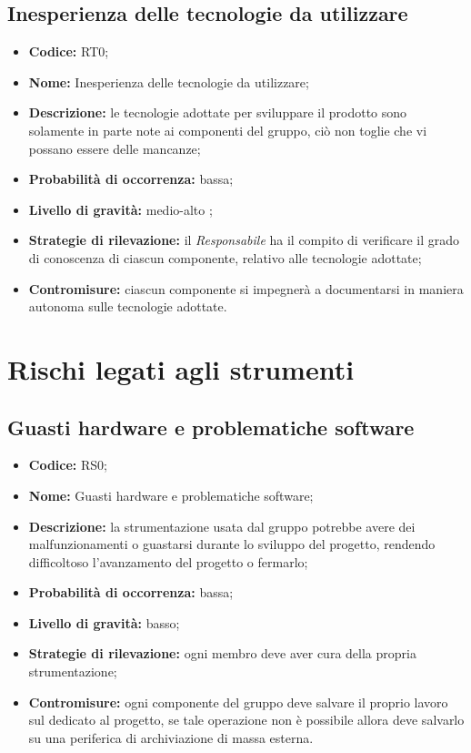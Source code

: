 \documentclass[./PianodiProgetto.tex]{subfiles}
\begin{document}
\subsection{Inesperienza delle tecnologie da utilizzare}
\begin{itemize}
	\item \textbf{Codice:} RT0;
	\item \textbf{Nome:} Inesperienza delle tecnologie da utilizzare;
	\item \textbf{Descrizione:} le tecnologie adottate per sviluppare il prodotto sono solamente in parte note ai componenti del gruppo, ciò non toglie che vi possano essere delle mancanze;
	\item \textbf{Probabilità di occorrenza:} bassa;
	\item \textbf{Livello di gravità:} medio-alto ;
	\item \textbf{Strategie di rilevazione:} il \textit{Responsabile} ha il compito di verificare il grado di conoscenza di ciascun componente, relativo alle tecnologie adottate;
	\item \textbf{Contromisure:} ciascun componente si impegnerà a documentarsi in maniera autonoma sulle tecnologie adottate. 
\end{itemize}

\section{Rischi legati agli strumenti}

\subsection{Guasti hardware e problematiche software}
\begin{itemize}
	\item \textbf{Codice:} RS0;
	\item \textbf{Nome:} Guasti hardware e problematiche software;
	\item \textbf{Descrizione:} la strumentazione usata dal gruppo potrebbe avere dei malfunzionamenti o guastarsi durante lo sviluppo del progetto, rendendo difficoltoso l'avanzamento del progetto o fermarlo;
	\item \textbf{Probabilità di occorrenza:} bassa;
	\item \textbf{Livello di gravità:} basso;
	\item \textbf{Strategie di rilevazione:} ogni membro deve aver cura della propria strumentazione;
	\item \textbf{Contromisure:} ogni componente del gruppo deve salvare il proprio lavoro sul   dedicato al progetto, se tale operazione non è possibile allora deve salvarlo su una periferica di archiviazione di massa esterna.
\end{itemize}
\end{document}
